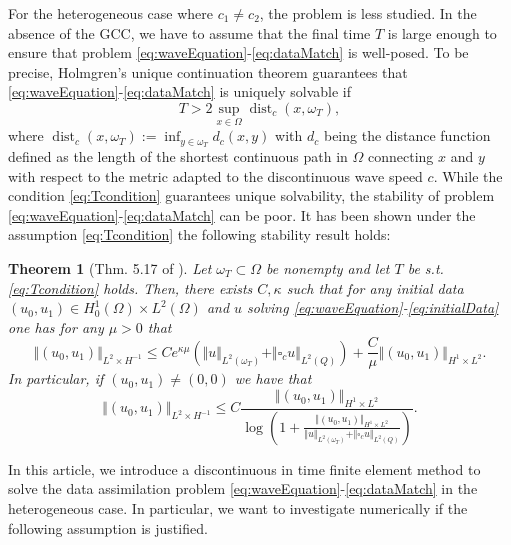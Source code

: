 \documentclass[sn-mathphys-num]{sn-jnl}
\newtheorem{thm}{Theorem}[section]
\numberwithin{equation}{section}
\newcommand{\wop}{\square_c}
\begin{document}
\noindent For the heterogeneous case where $c_1 \not =  c_2$, the problem is less studied. In the absence of the GCC, we have to assume that the final time $T$ is large enough to ensure that problem \eqref{eq:waveEquation}-\eqref{eq:dataMatch} is well-posed. To be precise, Holmgren's unique continuation theorem guarantees that \eqref{eq:waveEquation}-\eqref{eq:dataMatch} is uniquely solvable if
\begin{equation}\label{eq:Tcondition}
    T > 2 \sup_{x \in \Omega} \operatorname{dist}_{c}(x,\omega_T),
\end{equation}
where $\operatorname{dist}_c(x,\omega_T) := \inf_{y \in \omega_T} d_c(x,y)$ with $d_c$ being the distance function defined as the length of the shortest continuous path in $\Omega$ connecting $x$ and $y$ with respect to the metric adapted to the discontinuous wave speed $c$. While the condition \eqref{eq:Tcondition} guarantees unique solvability, the stability of problem \eqref{eq:waveEquation}-\eqref{eq:dataMatch} can be poor. It has been shown \cite[Thm. 5.17]{Filippas22} under the assumption \eqref{eq:Tcondition} the following stability result holds:  
\begin{thm}[Thm. 5.17 of \cite{Filippas22}]\label{thm:filippas}
    Let $\omega_T \subset \Omega$ be nonempty and let $T$ be s.t. \eqref{eq:Tcondition} holds. Then, there exists $C,\kappa$ such that for any initial data $(u_0,u_1) \in H^1_0(\Omega) \times L^2(\Omega)$ and $u$ solving \eqref{eq:waveEquation}-\eqref{eq:initialData} one has for any $\mu > 0$ that 
    \begin{equation}\label{eq:FilippasEstimate}
        \Vert (u_0,u_1) \Vert_{L^2 \times H^{-1}} \le C e^{\kappa \mu} \left( \Vert u \Vert_{L^2(\omega_T)} + \Vert \wop u \Vert_{L^2(Q)} \right) + \frac{C}{\mu} \Vert (u_0,u_1) \Vert_{H^1 \times L^2}. 
    \end{equation}
    In particular, if $(u_0,u_1) \not = (0,0)$ we have that 
    \begin{equation}\label{eq:FilippasEstimateLog}
        \Vert (u_0,u_1) \Vert_{L^2 \times H^{-1}} \le C \frac{\Vert (u_0,u_1) \Vert_{H^1 \times L^2}}{\log \left( 1 + \frac{\Vert (u_0,u_1) \Vert_{H^1 \times L^2}}{ \Vert u \Vert_{L^2(\omega_T)} + \Vert \wop u \Vert_{L^2(Q)}} \right)}. 
    \end{equation} 
\end{thm} 



\noindent In this article, we introduce a discontinuous in time finite element method to solve the data assimilation problem \eqref{eq:waveEquation}-\eqref{eq:dataMatch} in the heterogeneous case. In particular, we want to investigate numerically if the following assumption is justified. 
\end{document}
